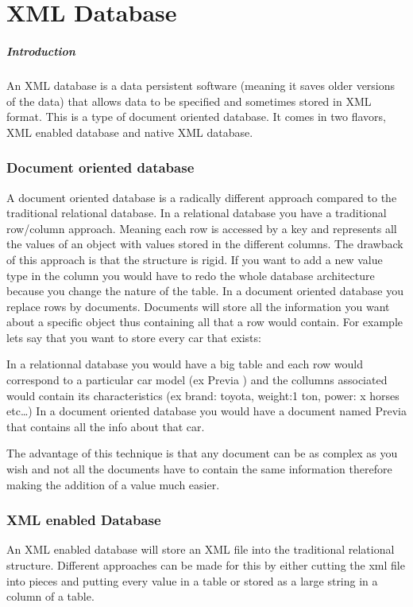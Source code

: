 

\chapter{XML Database}
\paragraph{Introduction}
An XML database is a data persistent software (meaning it saves older versions of the data) that allows data to be specified and sometimes stored in XML format. This is a type of document oriented database. It comes in two flavors, XML enabled database and native XML database.
\subsection{Document oriented database}

A document oriented database is a radically different approach compared to the traditional relational database. In a relational database you have a traditional row/column approach. Meaning each row is accessed by a key and represents all the values of an object with values stored in the different columns. The drawback of this approach is that the structure is rigid. If you want to add a new value type in the column you would have to redo the whole database architecture because you change the nature of the table. In a document oriented database you replace rows by documents. Documents will store all the information you want about a specific object thus containing all that a row would contain. For example lets say that you want to store every car that exists:

    In a relationnal database you would have a big table and each row would correspond to a particular car model (ex Previa ) and the collumns associated would contain its characteristics (ex brand: toyota, weight:1 ton, power: x horses etc…)
    In a document oriented database you would have a document named Previa that contains all the info about that car.

The advantage of this technique is that any document can be as complex as you wish and not all the documents have to contain the same information therefore making the addition of a value much easier.
\subsection{XML enabled Database}

An XML enabled database will store an XML file into the traditional relational structure. Different approaches can be made for this by either cutting the xml file into pieces and putting every value in a table or stored as a large string in a column of a table.
